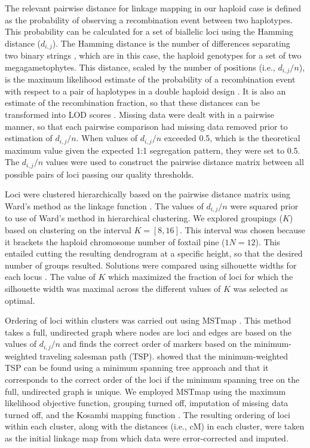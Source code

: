 \documentclass[smallextended]{svjour3}
\begin{document}
The relevant pairwise distance for linkage mapping in our haploid case is
defined as the probability of observing a recombination event between two
haplotypes. This probability can be calculated for a set of biallelic loci using
the Hamming distance ($d_{i,j}$).  The Hamming distance is the number of
differences separating two binary strings \citep{Hamming:1950}, which are in
this case, the haploid genotypes for a set of two megagametophytes.  This
distance, scaled by the number of positions (i.e., $d_{i,j}/n$), is the maximum
likelihood estimate of the probability of a recombination event with respect to
a pair of haplotypes in a double haploid design \citep{Wu:2008a}. It is also an
estimate of the recombination fraction, so that these distances can be
transformed into LOD scores \citep[see][]{Morton:1955}. Missing data were dealt
with in a pairwise manner, so that each pairwise comparison had missing data
removed prior to estimation of $d_{i,j}/n$. When values of $d_{i,j}/n$ exceeded
0.5, which is the theoretical maximum value given the expected 1:1 segregation
pattern, they were set to 0.5.  The $d_{i,j}/n$ values were used to construct
the pairwise distance matrix between all possible pairs of loci passing our
quality thresholds.

Loci were clustered hierarchically based on the pairwise distance matrix using
Ward's method as the linkage function \citep{Ward:1963}.  The values of
$d_{i,j}/n$ were squared prior to use of Ward's method in hierarchical
clustering.  We explored groupings ($K$) based on clustering on the interval
$K=[8,16]$. This interval was chosen because it brackets the haploid chromosome
number of foxtail pine ($1N = 12$). This entailed cutting the resulting
dendrogram at a specific height, so that the desired number of groups resulted.
Solutions were compared using silhouette widths for each locus
\citep{Rousseeuw:1987}.  The value of $K$ which maximized the fraction of loci
for which the silhouette width was maximal across the different values of $K$
was selected as optimal.

Ordering of loci within clusters was carried out using MSTmap
\citep{Wu:2008a}. This method takes a full, undirected graph where nodes are
loci and edges are based on the values of $d_{i,j}/n$ and finds the correct
order of markers based on the minimum-weighted traveling salesman path
(TSP). \citet{Wu:2008a} showed that the minimum-weighted TSP can be found using
a minimum spanning tree approach and that it corresponds to the correct order of
the loci if the minimum spanning tree on the full, undirected graph is
unique. We employed MSTmap using the maximum likelihood objective function,
grouping turned off, imputation of missing data turned off, and the Kosambi
mapping function \citep{Kosambi:1944}. The resulting ordering of loci within
each cluster, along with the distances (i.e., cM) in each cluster, were taken as
the initial linkage map from which data were error-corrected and imputed.
\end{document}
